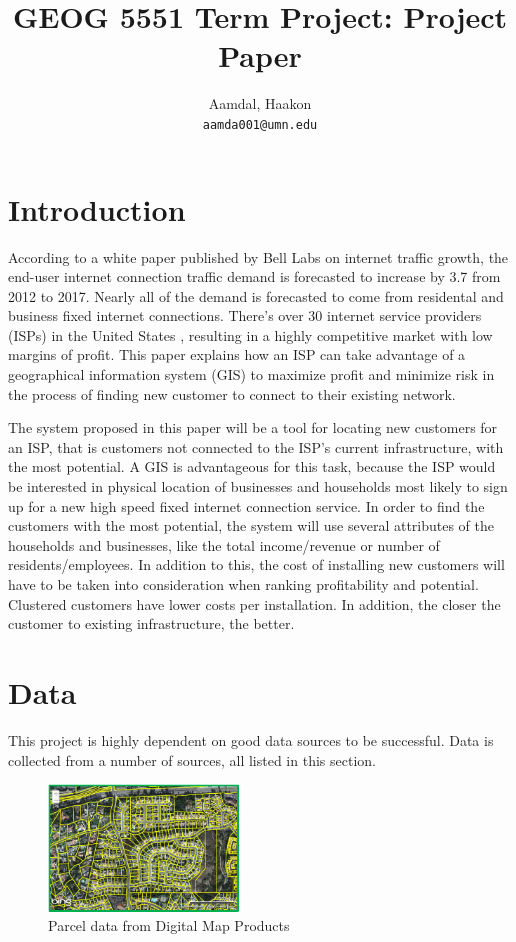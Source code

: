 \documentclass[twocolumn]{article}
\title{
    GEOG 5551 Term Project: Project Paper
}
\author{
    Aamdal, Haakon\\
    \texttt{aamda001@umn.edu}
}
\begin{document}
\maketitle

\section{Introduction}
\label{sec:Introduction}
According to a white paper published by Bell Labs \cite{Bell_Labs2013-st} on internet traffic growth, the end-user internet connection traffic demand is forecasted to increase by 3.7 from 2012 to 2017. Nearly all of the demand is forecasted to come from residental and business fixed internet connections. There's over 30 internet service providers (ISPs) in the United States \cite{noauthor_undated-uf}, resulting in a highly competitive market with low margins of profit. This paper explains how an ISP can take advantage of a geographical information system (GIS) to maximize profit and minimize risk in the process of finding new customer to connect to their existing network.

The system proposed in this paper will be a tool for locating new customers for an ISP, that is customers not connected to the ISP's current infrastructure, with the most potential. A GIS is advantageous for this task, because the ISP would be interested in physical location of businesses and households most likely to sign up for a new high speed fixed internet connection service. In order to find the customers with the most potential, the system will use several attributes of the households and businesses, like the total income/revenue or number of residents/employees. In addition to this, the cost of installing new customers will have to be taken into consideration when ranking profitability and potential. Clustered customers have lower costs per installation. In addition, the closer the customer to existing infrastructure, the better.

\section{Data}
\label{sec:Data}
This project is highly dependent on good data sources to be successful. Data is collected from a number of sources, all listed in this section.

\begin{figure}
  \centering
  \includegraphics[width=0.45\textwidth]{img/parcel.png}
  \caption{Parcel data from Digital Map Products}
  \label{fig:parcel}

\end{figure}
\end{document}
